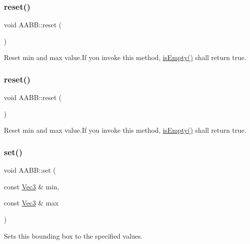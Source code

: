 \subsubsection{\texorpdfstring{reset()}{reset()}\hspace{0.1cm}{\footnotesize\ttfamily [1/2]}}
{\footnotesize\ttfamily void A\+A\+B\+B\+::reset (\begin{DoxyParamCaption}{ }\end{DoxyParamCaption})}

Reset min and max value.\+If you invoke this method, \hyperlink{classAABB_a477f106679bcd7dd24c3836bb242e542}{is\+Empty()} shall return true. \mbox{\label{classAABB_a5cbdbeaef02a2a748105c940c49bba74}} 
\subsubsection{\texorpdfstring{reset()}{reset()}\hspace{0.1cm}{\footnotesize\ttfamily [2/2]}}
{\footnotesize\ttfamily void A\+A\+B\+B\+::reset (\begin{DoxyParamCaption}{ }\end{DoxyParamCaption})}

Reset min and max value.\+If you invoke this method, \hyperlink{classAABB_a477f106679bcd7dd24c3836bb242e542}{is\+Empty()} shall return true. \mbox{\label{classAABB_affb444abca90805ba57c528e9ccf3197}} 
\subsubsection{\texorpdfstring{set()}{set()}\hspace{0.1cm}{\footnotesize\ttfamily [1/2]}}
{\footnotesize\ttfamily void A\+A\+B\+B\+::set (\begin{DoxyParamCaption}\item[{const \hyperlink{classVec3}{Vec3} \&}]{min,  }\item[{const \hyperlink{classVec3}{Vec3} \&}]{max }\end{DoxyParamCaption})}

Sets this bounding box to the specified values. \mbox{\label{classAABB_affb444abca90805ba57c528e9ccf3197}} 
